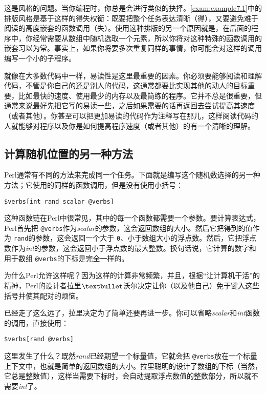 这是风格的问题。当你编程时，你总是会进行类似的抉择。\autoref{exam:example7.1}中的排版风格是基于这样的得失权衡：既要把整个任务表达清晰（得），又要避免难于阅读的高度嵌套的函数调用（失）。使用这种排版的另一个原因就是，在后面的程序中，你经常需要从数组中随机选取一个元素，所以你将对这种特殊的函数调用的嵌套习以为常。事实上，如果你将要多次重复同样的事情，你可能会对这样的调用编写一个小的子程序。

就像在大多数代码中一样，易读性是这里最重要的因素。你必须要能够阅读和理解代码，不管是你自己的还是别人的代码，这通常都要比实现其他的动人的目标重要，比如最快的速度、使用最少的内存以及最简练的程序。它并不总是很重要，但通常来说最好先把它写的易读一些，之后如果需要的话再返回去尝试提高其速度（或者其他）。你甚至可以把更加易读的代码作为注释写在那儿，这样阅读代码的人就能够对程序以及你是如何提高程序速度（或者其他）的有一个清晰的理解。

\subsection{计算随机位置的另一种方法}
Perl通常有不同的方法来完成同一个任务。下面就是编写这个随机数选择的另一种方法；它使用的同样的函数调用，但是没有使用小括号：

\begin{lstlisting}
$verbs[int rand scalar @verbs]
\end{lstlisting}

这种函数链在Perl中很常见，其中的每一个函数都需要一个参数。要计算表达式，Perl首先把 \verb|@verbs|作为\textit{scalar}的参数，这会返回数组的大小。然后它把得到的值作为 \verb|rand|的参数，这会返回一个大于 \verb|0|、小于数组大小的浮点数。然后，它把浮点数作为\textit{int}的参数，这会返回小于浮点数的最大整数。换句话说，它计算的数字和用于数组 \verb|@verbs|的下标是完全一样的。

为什么Perl允许这样呢？因为这样的计算非常频繁，并且，根据“让计算机干活”的精神，Perl的设计者拉里$\textbullet$沃尔决定让你（以及他自己）免于键入这些括号并使其配对的烦恼。

已经走了这么远了，拉里决定为了简单还要再进一步。你可以省略\textit{scalar}和\textit{int}函数的调用，直接使用：

\begin{lstlisting}
$verbs[rand @verbs]
\end{lstlisting}

这里发生了什么？既然\textit{rand}已经期望一个标量值，它就会把 \verb|@verbs|放在一个标量上下文中，也就是简单的返回数组的大小。拉里聪明的设计了数组的下标（当然，它总是整数值），这样当需要下标时，会自动提取浮点数值的整数部分，所以就不需要\textit{int}了。

